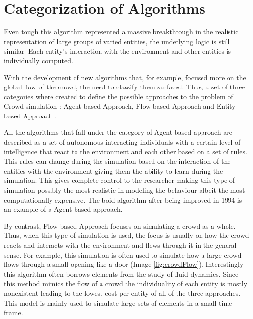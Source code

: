 \documentclass[sigconf]{acmart}
\begin{document}
\section{Categorization of Algorithms}

Even tough this algorithm represented a massive breakthrough in the realistic representation
of large groups of varied entities, the underlying logic is still similar: Each entity's
interaction with the environment and other entities is individually computed. 

With the development of new algorithms that, for example, focused more on the global
flow of the crowd, the need to classify them surfaced. Thus, a set of three categories
where created to define the possible approaches to the problem of Crowd simulation
: Agent-based Approach, Flow-based Approach and Entity-based Approach \cite{Zhou2010}.

All the algorithms that fall under the category of Agent-based approach are described as
a set of autonomous interacting individuals with a certain level of intelligence that react
to the environment and each other based on a set of rules. This rules can change during
the simulation based on the interaction of the entities with the environment giving them
the ability to learn during the simulation. This gives complete control to the researcher
making this type of simulation possibly the most realistic in modeling the behaviour albeit
the most computationally expensive. The boid algorithm after being improved in 1994 is an
example of a Agent-based approach.

By contrast, Flow-based Approach focuses on simulating a crowd as a whole. Thus, when this type
of simulation is used, the focus is usually on how the crowd reacts and interacts
with the environment and flows through it in the general sense. For example, this simulation is
often used to simulate how a large crowd flows through a small opening like a door
(Image \ref{fig:crowdFlow}). Interestingly this algorithm often
borrows elements from the study of fluid dynamics\cite{YUAN20114210}. Since this method mimics
the flow of a crowd the individuality of each entity is mostly nonexistent leading to
the lowest cost per entity of all of the three approaches. This model is mainly used to
simulate large sets of elements in a small time frame.
\end{document}
